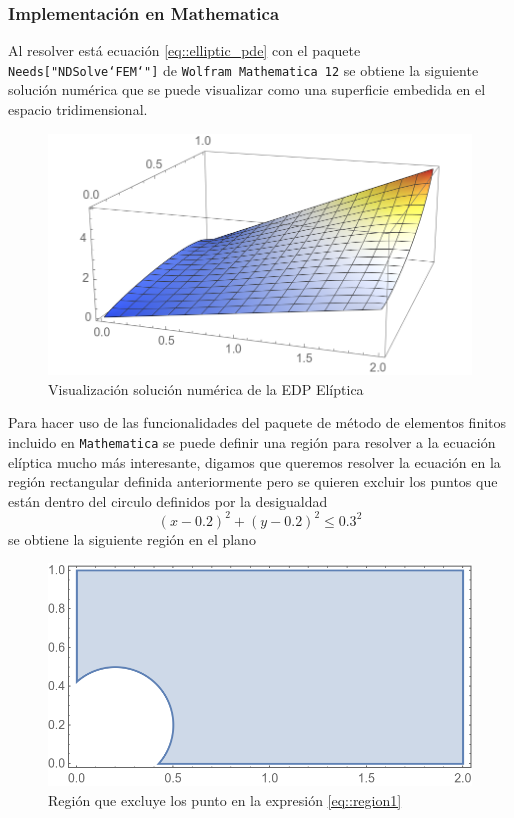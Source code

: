 \documentclass[a4paper]{article}
\begin{document}
\subsubsection{Implementación en Mathematica}
Al resolver está ecuación \ref{eq::elliptic_pde} con el paquete \texttt{Needs["NDSolve`FEM`"]} de \texttt{Wolfram Mathematica 12} se obtiene la siguiente solución numérica que se puede visualizar como una superficie embedida en el espacio tridimensional.
\begin{figure}[H]
\begin{center}
\includegraphics[scale=0.42]{./elliptic.png} 
\end{center} 
\caption{Visualización solución numérica de la EDP Elíptica}
\label{fig::fig2}
\end{figure}
Para hacer uso de las funcionalidades del paquete de método de elementos finitos incluido en \texttt{Mathematica} se puede definir una región para resolver a la ecuación elíptica mucho más interesante, digamos que queremos resolver la ecuación en la región rectangular definida anteriormente pero se quieren excluir los puntos que están dentro del circulo definidos por la desigualdad
\begin{equation}\label{eq::region1}
(x-0.2)^2+(y-0.2)^2\leq 0.3^2
\end{equation}
se obtiene la siguiente región en el plano
\begin{figure}[H]
\begin{center}
\includegraphics[scale=0.42]{./elliptic_omega.png} 
\end{center} 
\caption{Región que excluye los punto en la expresión \ref{eq::region1}}
\label{fig::fig3}
\end{figure}
\end{document}
